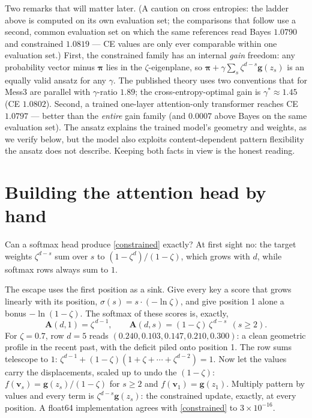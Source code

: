 \documentclass{article}
\newcommand{\pib}{\boldsymbol{\pi}}
\newcommand{\gb}{\boldsymbol{g}}
\newcommand{\vb}{\boldsymbol{v}}
\newcommand{\Ab}{\boldsymbol{A}}
\begin{document}
Two remarks that will matter later. (A caution on cross entropies: the
ladder above is computed on its own evaluation set; the comparisons that
follow use a second, common evaluation set on which the same references
read Bayes $1.0790$ and constrained $1.0819$ --- CE values are only ever
comparable within one evaluation set.) First, the constrained family has an
internal \emph{gain} freedom: any probability vector minus $\pib$ lies in
the $\zeta$-eigenplane, so $\pib + \gamma \sum_s \zeta^{d-s}\gb(z_s)$ is an
equally valid ansatz for any $\gamma$. The published theory uses two
conventions that for Mess3 are parallel with $\gamma$-ratio $1.89$; the
cross-entropy-optimal gain is $\gamma^\ast \approx 1.45$ (CE $1.0802$).
Second, a trained one-layer attention-only transformer reaches CE
$1.0797$ --- better than the \emph{entire} gain family (and $0.0007$ above
Bayes on the same evaluation set). The ansatz explains
the trained model's geometry and weights, as we verify below, but the model
also exploits content-dependent pattern flexibility the ansatz does not
describe. Keeping both facts in view is the honest reading.

\section{Building the attention head by hand}

Can a softmax head produce \eqref{constrained} exactly? At first sight no:
the target weights $\zeta^{d-s}$ sum over $s$ to $(1-\zeta^d)/(1-\zeta)$,
which grows with $d$, while softmax rows always sum to $1$.

The escape uses the first position as a sink. Give every key a score that
grows linearly with its position, $\sigma(s) = s \cdot (-\ln\zeta)$, and
give position 1 alone a bonus $-\ln(1-\zeta)$. The softmax of these scores
is, exactly,
\begin{equation}\label{exactpattern}
\Ab(d, 1) = \zeta^{\,d-1}, \qquad \Ab(d, s) = (1-\zeta)\,\zeta^{\,d-s}
\ \ (s \ge 2).
\end{equation}
For $\zeta = 0.7$, row $d = 5$ reads $(0.240, 0.103, 0.147, 0.210, 0.300)$:
a clean geometric profile in the recent past, with the deficit piled onto
position 1. The row sums telescope to $1$:
$\zeta^{d-1} + (1-\zeta)(1 + \zeta + \cdots + \zeta^{d-2}) = 1$. Now let the
values carry the displacements, scaled up to undo the $(1-\zeta)$:
$f(\vb_s) = \gb(z_s)/(1-\zeta)$ for $s \ge 2$ and $f(\vb_1) = \gb(z_1)$.
Multiply pattern by values and every term is $\zeta^{d-s}\gb(z_s)$: the
constrained update, exactly, at every position. A float64 implementation
agrees with \eqref{constrained} to $3 \times 10^{-16}$.
\end{document}
